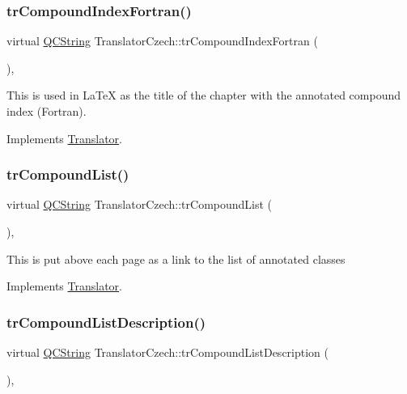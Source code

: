 \subsubsection{\texorpdfstring{trCompoundIndexFortran()}{trCompoundIndexFortran()}}
{\footnotesize\ttfamily virtual \mbox{\hyperlink{class_q_c_string}{Q\+C\+String}} Translator\+Czech\+::tr\+Compound\+Index\+Fortran (\begin{DoxyParamCaption}{ }\end{DoxyParamCaption})\hspace{0.3cm}{\ttfamily [inline]}, {\ttfamily [virtual]}}

This is used in La\+TeX as the title of the chapter with the annotated compound index (Fortran). 

Implements \mbox{\hyperlink{class_translator}{Translator}}.

\mbox{\label{class_translator_czech_a29a3cce0c9a8d68aadc2d3932e41e123}} 
\subsubsection{\texorpdfstring{trCompoundList()}{trCompoundList()}}
{\footnotesize\ttfamily virtual \mbox{\hyperlink{class_q_c_string}{Q\+C\+String}} Translator\+Czech\+::tr\+Compound\+List (\begin{DoxyParamCaption}{ }\end{DoxyParamCaption})\hspace{0.3cm}{\ttfamily [inline]}, {\ttfamily [virtual]}}

This is put above each page as a link to the list of annotated classes 

Implements \mbox{\hyperlink{class_translator}{Translator}}.

\mbox{\label{class_translator_czech_abe717489d9743ec9d2ace3dc6c593fac}} 
\subsubsection{\texorpdfstring{trCompoundListDescription()}{trCompoundListDescription()}}
{\footnotesize\ttfamily virtual \mbox{\hyperlink{class_q_c_string}{Q\+C\+String}} Translator\+Czech\+::tr\+Compound\+List\+Description (\begin{DoxyParamCaption}{ }\end{DoxyParamCaption})\hspace{0.3cm}{\ttfamily [inline]}, {\ttfamily [virtual]}}

